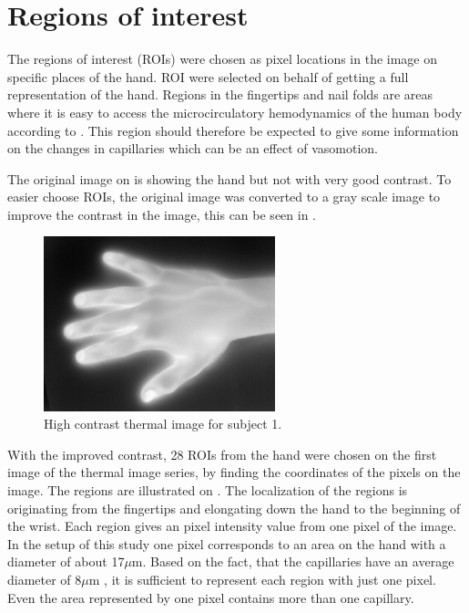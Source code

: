 \section{Regions of interest}

The regions of interest (ROIs) were chosen as pixel locations in the image on specific places of the hand. ROI were selected on behalf of getting a full representation of the hand. 
Regions in the fingertips and nail folds are areas where it is easy to access the microcirculatory hemodynamics of the human body according to \cite{Iabichella2006}. This region should therefore be expected to give some information on the changes in capillaries which can be an effect of vasomotion. 

The original image on  is showing the hand but not with very good contrast. To easier choose ROIs, the original image was converted to a gray scale image to improve the contrast in the image, this can be seen in . 

\begin{figure}[H]
	\includegraphics[width=0.6\textwidth]{figures/mat2grayHand}  %
	\caption{High contrast thermal image for subject 1.}
	\label{fig:mat2grayHand}  %
\end{figure}

With the improved contrast, 28 ROIs from the hand were chosen on the first image of the thermal image series, by finding the coordinates of the pixels on the image. The regions are illustrated on . The localization of the regions is originating from the fingertips and elongating down the hand to the beginning of the wrist. Each region gives an pixel intensity value from one pixel of the image. In the setup of this study one pixel corresponds to an area on the hand with a diameter of about 17$\mu$m. Based on the fact, that the capillaries have an average diameter of 8$\mu$m \cite{martini2012}, it is sufficient to represent each region with just one pixel. Even the area represented by one pixel contains more than one capillary.

